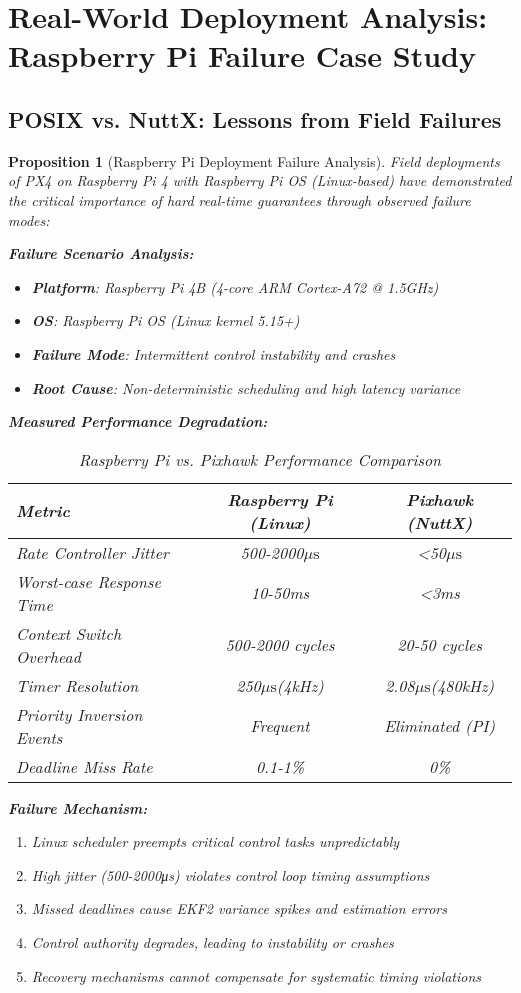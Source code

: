 \documentclass[11pt,a4paper]{article}
\newcommand{\mus}{\ensuremath{\mu\text{s}}}
\newtheorem{proposition}[theorem]{Proposition}
\theoremstyle{definition}
\theoremstyle{remark}
\begin{document}
\section{Real-World Deployment Analysis: Raspberry Pi Failure Case Study}

\subsection{POSIX vs. NuttX: Lessons from Field Failures}

\begin{proposition}[Raspberry Pi Deployment Failure Analysis]
Field deployments of PX4 on Raspberry Pi 4 with Raspberry Pi OS (Linux-based) have demonstrated the critical importance of hard real-time guarantees through observed failure modes:

\textbf{Failure Scenario Analysis:}
\begin{itemize}
\item \textbf{Platform}: Raspberry Pi 4B (4-core ARM Cortex-A72 @ 1.5GHz)
\item \textbf{OS}: Raspberry Pi OS (Linux kernel 5.15+)
\item \textbf{Failure Mode}: Intermittent control instability and crashes
\item \textbf{Root Cause}: Non-deterministic scheduling and high latency variance
\end{itemize}

\textbf{Measured Performance Degradation:}
\begin{table}[h]
\centering
\caption{Raspberry Pi vs. Pixhawk Performance Comparison}
\begin{tabular}{lcc}
\toprule
\textbf{Metric} & \textbf{Raspberry Pi (Linux)} & \textbf{Pixhawk (NuttX)} \\
\midrule
Rate Controller Jitter & 500-2000\mus & <50\mus \\
Worst-case Response Time & 10-50ms & <3ms \\
Context Switch Overhead & 500-2000 cycles & 20-50 cycles \\
Timer Resolution & 250\mus (4kHz) & 2.08\mus (480kHz) \\
Priority Inversion Events & Frequent & Eliminated (PI) \\
Deadline Miss Rate & 0.1-1\% & 0\% \\
\bottomrule
\end{tabular}
\end{table}

\textbf{Failure Mechanism:}
\begin{enumerate}
\item Linux scheduler preempts critical control tasks unpredictably
\item High jitter (500-2000μs) violates control loop timing assumptions
\item Missed deadlines cause EKF2 variance spikes and estimation errors
\item Control authority degrades, leading to instability or crashes
\item Recovery mechanisms cannot compensate for systematic timing violations
\end{enumerate}
\end{proposition}
\end{document}
